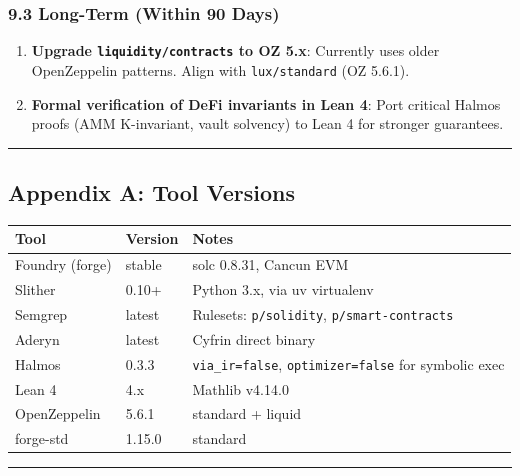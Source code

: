 \documentclass[
]{article}
\newcounter{none} %
\begin{document}
\subsubsection{9.3 Long-Term (Within 90
Days)}\label{93-long-term-within-90-days}

\begin{enumerate}
\def\labelenumi{\arabic{enumi}.}
\setcounter{enumi}{6}
\item
  \textbf{Upgrade \texttt{liquidity/contracts} to OZ 5.x}: Currently
  uses older OpenZeppelin patterns. Align with \texttt{lux/standard} (OZ
  5.6.1).
\item
  \textbf{Formal verification of DeFi invariants in Lean 4}: Port
  critical Halmos proofs (AMM K-invariant, vault solvency) to Lean 4 for
  stronger guarantees.
\end{enumerate}

\begin{center}\rule{0.5\linewidth}{0.5pt}\end{center}

\subsection{Appendix A: Tool Versions}\label{appendix-a-tool-versions}

{\def\LTcaptype{none} %
\begin{longtable}[]{@{}lll@{}}
\toprule\noalign{}
Tool & Version & Notes \\
\midrule\noalign{}
\endhead
\bottomrule\noalign{}
\endlastfoot
Foundry (forge) & stable & solc 0.8.31, Cancun EVM \\
Slither & 0.10+ & Python 3.x, via uv virtualenv \\
Semgrep & latest & Rulesets: \texttt{p/solidity},
\texttt{p/smart-contracts} \\
Aderyn & latest & Cyfrin direct binary \\
Halmos & 0.3.3 & \texttt{via\_ir=false}, \texttt{optimizer=false} for
symbolic exec \\
Lean 4 & 4.x & Mathlib v4.14.0 \\
OpenZeppelin & 5.6.1 & standard + liquid \\
forge-std & 1.15.0 & standard \\
\end{longtable}
}

\begin{center}\rule{0.5\linewidth}{0.5pt}\end{center}
\end{document}
